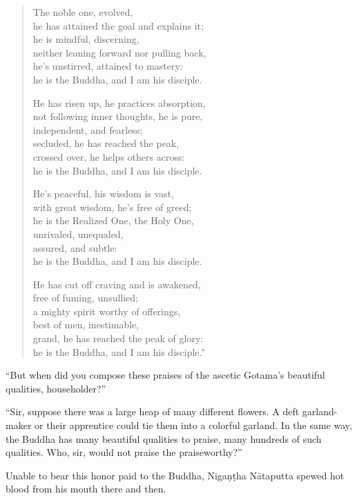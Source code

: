 \documentclass[12pt,openany]{book}%
\begin{document}
\begin{verse}
The noble one, evolved, \\
he has attained the goal and explains it; \\
he is mindful, discerning, \\
neither leaning forward nor pulling back, \\
he’s unstirred, attained to mastery: \\
he is the Buddha, and I am his disciple. 

He has risen up, he practices absorption, \\
not following inner thoughts, he is pure, \\
independent, and fearless; \\
secluded, he has reached the peak, \\
crossed over, he helps others across: \\
he is the Buddha, and I am his disciple. 

He’s peaceful, his wisdom is vast, \\
with great wisdom, he’s free of greed; \\
he is the Realized One, the Holy One, \\
unrivaled, unequaled, \\
assured, and subtle: \\
he is the Buddha, and I am his disciple. 

He has cut off craving and is awakened, \\
free of fuming, unsullied; \\
a mighty spirit worthy of offerings, \\
best of men, inestimable, \\
grand, he has reached the peak of glory: \\
he is the Buddha, and I am his disciple.” 

%
\end{verse}

“But when did you compose these praises of the ascetic Gotama’s beautiful qualities, householder?” 

“Sir, suppose there was a large heap of many different flowers. A deft garland-maker or their apprentice could tie them into a colorful garland. In the same way, the Buddha has many beautiful qualities to praise, many hundreds of such qualities. Who, sir, would not praise the praiseworthy?” 

Unable to bear this honor paid to the Buddha, \textsanskrit{Nigaṇṭha} \textsanskrit{Nātaputta} spewed hot blood from his mouth there and then. 
\end{document}
